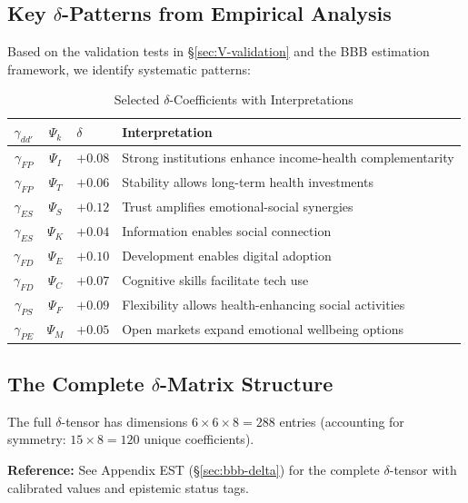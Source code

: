 \subsection{Key $\delta$-Patterns from Empirical Analysis}

Based on the validation tests in \S\ref{sec:V-validation} and the BBB estimation 
framework, we identify systematic patterns:

\begin{table}[htbp]
\centering
\caption{Selected $\delta$-Coefficients with Interpretations}
\label{tab:V-delta-selected}
\small
\renewcommand{\arraystretch}{1.2}
\begin{tabular}{@{}cclp{5cm}@{}}
\toprule
\textbf{$\gamma_{dd'}$} & \textbf{$\Psi_k$} & \textbf{$\delta$} & \textbf{Interpretation} \\
\midrule
$\gamma_{FP}$ & $\Psi_I$ & $+0.08$ & Strong institutions enhance income-health complementarity \\
$\gamma_{FP}$ & $\Psi_T$ & $+0.06$ & Stability allows long-term health investments \\
$\gamma_{ES}$ & $\Psi_S$ & $+0.12$ & Trust amplifies emotional-social synergies \\
$\gamma_{ES}$ & $\Psi_K$ & $+0.04$ & Information enables social connection \\
$\gamma_{FD}$ & $\Psi_E$ & $+0.10$ & Development enables digital adoption \\
$\gamma_{FD}$ & $\Psi_C$ & $+0.07$ & Cognitive skills facilitate tech use \\
$\gamma_{PS}$ & $\Psi_F$ & $+0.09$ & Flexibility allows health-enhancing social activities \\
$\gamma_{PE}$ & $\Psi_M$ & $+0.05$ & Open markets expand emotional wellbeing options \\
\bottomrule
\end{tabular}
\end{table}

\subsection{The Complete $\delta$-Matrix Structure}

The full $\delta$-tensor has dimensions $6 \times 6 \times 8 = 288$ entries 
(accounting for symmetry: $15 \times 8 = 120$ unique coefficients).

\textbf{Reference:} See Appendix EST (\S\ref{sec:bbb-delta}) for the complete 
$\delta$-tensor with calibrated values and epistemic status tags.

